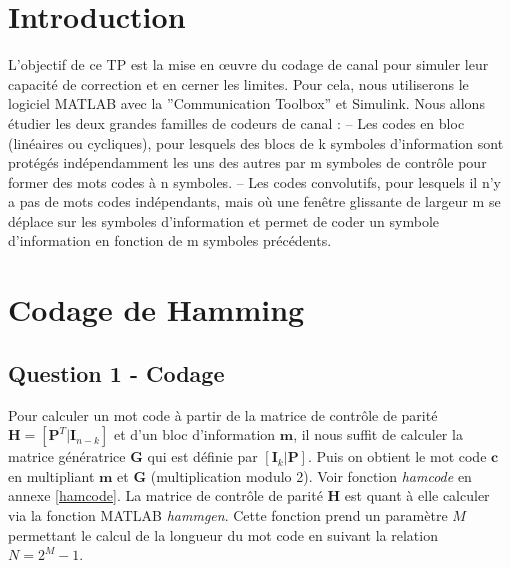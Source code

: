 \documentclass[a4paper, 12pt]{article}
\begin{document}






\clearpage

\section{Introduction}

L’objectif de ce TP est la mise en œuvre du codage de canal pour simuler leur capacité de correction
et en cerner les limites. Pour cela, nous utiliserons le logiciel MATLAB avec la ”Communication Toolbox”
et Simulink. Nous allons étudier les deux grandes familles de codeurs de canal :
– Les codes en bloc (linéaires ou cycliques), pour lesquels des blocs de k symboles d’information sont
protégés indépendamment les uns des autres par m symboles de contrôle pour former des mots
codes à n symboles.
– Les codes convolutifs, pour lesquels il n’y a pas de mots codes indépendants, mais où une fenêtre
glissante de largeur m se déplace sur les symboles d’information et permet de coder un symbole
d’information en fonction de m symboles précédents.


\section{Codage de Hamming}

\subsection{Question 1 - Codage}

Pour calculer un mot code à partir de la matrice de contrôle de parité $\mathbf{H} = [\mathbf{P}^T | \mathbf{I}_{n-k}]$ et d'un bloc d'information $\mathbf{m}$, il nous suffit de calculer la matrice génératrice $\mathbf{G}$ qui est définie par $[\mathbf{I}_k | \mathbf{P}]$. Puis on obtient le mot code $\mathbf{c}$ en multipliant $\mathbf{m}$ et $\mathbf{G}$ (multiplication modulo 2). Voir fonction \textit{hamcode} en annexe \ref{hamcode}. La matrice de contrôle de parité $\mathbf{H}$ est quant à elle calculer via la fonction MATLAB \textit{hammgen}. Cette fonction prend un paramètre $M$ permettant le calcul de la longueur du mot code en suivant la relation $N=2^M-1$. \\
\end{document}
